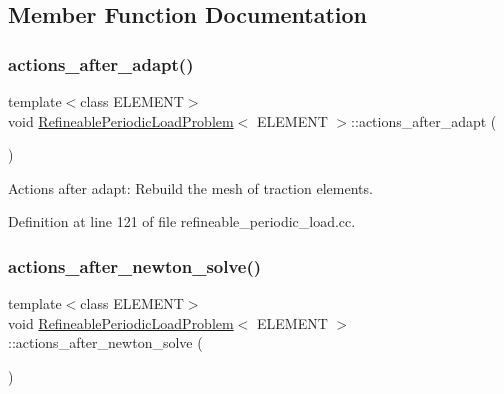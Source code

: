 \subsection{Member Function Documentation}
\mbox{\label{classRefineablePeriodicLoadProblem_ad4fdb5d3805ea8dec6cedf515e5a73d7}} 
\subsubsection{\texorpdfstring{actions\+\_\+after\+\_\+adapt()}{actions\_after\_adapt()}}
{\footnotesize\ttfamily template$<$class E\+L\+E\+M\+E\+NT$>$ \\
void \hyperlink{classRefineablePeriodicLoadProblem}{Refineable\+Periodic\+Load\+Problem}$<$ E\+L\+E\+M\+E\+NT $>$\+::actions\+\_\+after\+\_\+adapt (\begin{DoxyParamCaption}{ }\end{DoxyParamCaption})\hspace{0.3cm}{\ttfamily [inline]}}



Actions after adapt\+: Rebuild the mesh of traction elements. 



Definition at line 121 of file refineable\+\_\+periodic\+\_\+load.\+cc.

\mbox{\label{classRefineablePeriodicLoadProblem_a5b1bd71066266f1eb1cc36d524d57894}} 
\subsubsection{\texorpdfstring{actions\+\_\+after\+\_\+newton\+\_\+solve()}{actions\_after\_newton\_solve()}}
{\footnotesize\ttfamily template$<$class E\+L\+E\+M\+E\+NT$>$ \\
void \hyperlink{classRefineablePeriodicLoadProblem}{Refineable\+Periodic\+Load\+Problem}$<$ E\+L\+E\+M\+E\+NT $>$\+::actions\+\_\+after\+\_\+newton\+\_\+solve (\begin{DoxyParamCaption}{ }\end{DoxyParamCaption})\hspace{0.3cm}{\ttfamily [inline]}}



